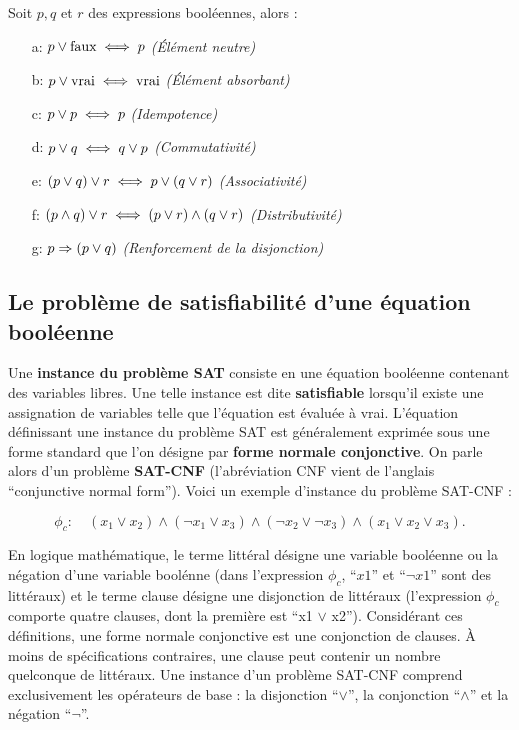 \documentclass[12]{article}%
\theoremstyle{plain}
\theoremstyle{definition}
\theoremstyle{remark}
\begin{document}
Soit \( p, q \) et \( r \) des expressions booléennes, alors :

\begin{itemize}[label=, leftmargin=1cm]
	\item[a:] \( p \lor \text{faux} \iff p \hfill \) \textit{(Élément neutre)}
	\item[b:] \( p \lor \text{vrai} \iff \text{vrai} \hfill \) \textit{(Élément absorbant)}
	\item[c:] \( p \lor p \iff p \hfill \) \textit{(Idempotence)}
	\item[d:] \( p \lor q \iff q \lor p \hfill \) \textit{(Commutativité)}
	\item[e:] \( (p \lor q) \lor r \iff p \lor (q \lor r) \hfill \) \textit{(Associativité)}
	\item[f:] \( (p \land q) \lor r \iff (p \lor r) \land (q \lor r) \hfill \) \textit{(Distributivité)}
	\item[g:] \( p \Rightarrow (p \lor q) \hfill \) \textit{(Renforcement de la disjonction)}
\end{itemize}

\subsection{Le problème de satisfiabilité d’une équation booléenne}
Une \textbf{instance du problème SAT} consiste en une équation booléenne contenant des variables libres. Une telle instance est dite \textbf{satisfiable} lorsqu’il existe une assignation de variables telle que l’équation est évaluée à vrai.
\newline \newline
L’équation définissant une instance du problème SAT est généralement exprimée sous une forme standard que l’on désigne par \textbf{forme normale conjonctive}. On parle alors d’un problème \textbf{SAT-CNF} (l’abréviation CNF vient de l’anglais “conjunctive normal form”). Voici un exemple d’instance du problème SAT-CNF :

\[
\phi_c :\quad (x_1 \lor x_2) \land (\neg x_1 \lor x_3) \land (\neg x_2 \lor \neg x_3) \land (x_1 \lor x_2 \lor x_3).
\]


En logique mathématique, le terme littéral désigne une variable booléenne ou la négation d’une variable boolénne (dans l’expression $\phi_c$, “$x1$” et “$\lnot x1$” sont des littéraux) et le terme clause désigne une disjonction de littéraux (l’expression $\phi_c$ comporte quatre clauses, dont la première est “x1 $\lor$ x2”). Considérant ces définitions, une forme normale conjonctive est une conjonction de clauses. À moins de spécifications contraires, une clause peut contenir un nombre quelconque de littéraux.
\newline \newline
Une instance d’un problème SAT-CNF comprend exclusivement les opérateurs de base :
la disjonction “$\lor$”, la conjonction “$\land$” et la négation “$\lnot$”.
\end{document}
